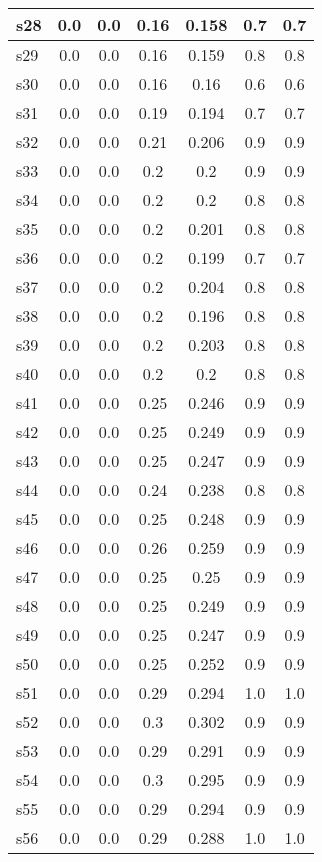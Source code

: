 \documentclass{article}
\begin{document}
\begin{tabular}{|l|c|c|c|c|c|c|}
\hline
s28 &0.0 & 0.0 & 0.16 & 0.158 & 0.7 & 0.7\\
\hline
s29 &0.0 & 0.0 & 0.16 & 0.159 & 0.8 & 0.8\\
\hline
s30 &0.0 & 0.0 & 0.16 & 0.16 & 0.6 & 0.6\\
\hline
s31 &0.0 & 0.0 & 0.19 & 0.194 & 0.7 & 0.7\\
\hline
s32 &0.0 & 0.0 & 0.21 & 0.206 & 0.9 & 0.9\\
\hline
s33 &0.0 & 0.0 & 0.2 & 0.2 & 0.9 & 0.9\\
\hline
s34 &0.0 & 0.0 & 0.2 & 0.2 & 0.8 & 0.8\\
\hline
s35 &0.0 & 0.0 & 0.2 & 0.201 & 0.8 & 0.8\\
\hline
s36 &0.0 & 0.0 & 0.2 & 0.199 & 0.7 & 0.7\\
\hline
s37 &0.0 & 0.0 & 0.2 & 0.204 & 0.8 & 0.8\\
\hline
s38 &0.0 & 0.0 & 0.2 & 0.196 & 0.8 & 0.8\\
\hline
s39 &0.0 & 0.0 & 0.2 & 0.203 & 0.8 & 0.8\\
\hline
s40 &0.0 & 0.0 & 0.2 & 0.2 & 0.8 & 0.8\\
\hline
s41 &0.0 & 0.0 & 0.25 & 0.246 & 0.9 & 0.9\\
\hline
s42 &0.0 & 0.0 & 0.25 & 0.249 & 0.9 & 0.9\\
\hline
s43 &0.0 & 0.0 & 0.25 & 0.247 & 0.9 & 0.9\\
\hline
s44 &0.0 & 0.0 & 0.24 & 0.238 & 0.8 & 0.8\\
\hline
s45 &0.0 & 0.0 & 0.25 & 0.248 & 0.9 & 0.9\\
\hline
s46 &0.0 & 0.0 & 0.26 & 0.259 & 0.9 & 0.9\\
\hline
s47 &0.0 & 0.0 & 0.25 & 0.25 & 0.9 & 0.9\\
\hline
s48 &0.0 & 0.0 & 0.25 & 0.249 & 0.9 & 0.9\\
\hline
s49 &0.0 & 0.0 & 0.25 & 0.247 & 0.9 & 0.9\\
\hline
s50 &0.0 & 0.0 & 0.25 & 0.252 & 0.9 & 0.9\\
\hline
s51 &0.0 & 0.0 & 0.29 & 0.294 & 1.0 & 1.0\\
\hline
s52 &0.0 & 0.0 & 0.3 & 0.302 & 0.9 & 0.9\\
\hline
s53 &0.0 & 0.0 & 0.29 & 0.291 & 0.9 & 0.9\\
\hline
s54 &0.0 & 0.0 & 0.3 & 0.295 & 0.9 & 0.9\\
\hline
s55 &0.0 & 0.0 & 0.29 & 0.294 & 0.9 & 0.9\\
\hline
s56 &0.0 & 0.0 & 0.29 & 0.288 & 1.0 & 1.0\\

\end{tabular}
\end{document}
